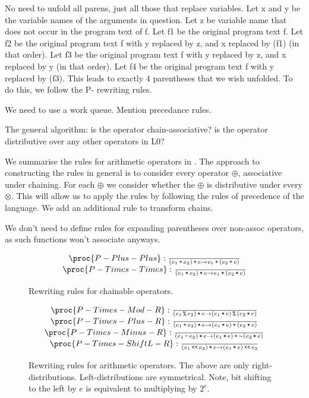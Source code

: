 No need to unfold all parens, just all those that replace variables. Let x and
y be the variable names of the arguments in question. Let z be variable name
that does not occur in the program text of f. Let f1 be the original program
text f. Let f2 be the original program text f with y replaced by z, and x
replaced by (f1) (in that order). Let f3 be the original program text f with y
replaced by z, and x replaced by y (in that order). Let f4 be the original
program text f with y replaced by (f3). This leads to exactly 4 parentheses
that we wish unfolded. To do this, we follow the P- rewriting rules.

We need to use a work queue. Mention precedance rules.

The general algorithm: is the operator chain-associative? is the operator
distributive over any other operators in L0?

We summarise the rules for arithmetic operators in
. The approach to constructing the rules in
general is to consider every operator $\oplus$, associative under chaining. For
each $\oplus$ we consider whether the $\oplus$ is distributive under every
$\otimes$. This will allow us to apply the rules by following the rules of
precedence of the language. We add an additional rule to transform chains.

We don't need to define rules for expanding parentheses over non-assoc
operators, as such functions won't associate anyways.

\begin{figure*}[htbp!]

\[
\begin{matrix}
\proc{P-Plus-Plus}:{\over
\p{e_1 \lp e_2}\lp e \rightarrow e_1 \lp \p{ e_2 \lp e }
}\\
\proc{P-Times-Times}:{\over
\p{e_1\lt e_2}\lt e \rightarrow e_1 \lt \p{ e_2 \lt e }
}\\
\end{matrix}
\]
\caption[]{Rewriting rules for chainable operators.}
\label{figure:rewriting-arithop}
\end{figure*}


\begin{figure*}[htbp!]

\[
\begin{matrix}
\proc{P-Times-Mod-R}:{\over
\p{e_1 \lmod e_2}\lt e \rightarrow \p{ e_1 \lt e } \lmod \p{ e_2 \lt e }
}\\
\proc{P-Times-Plus-R}:{\over
\p{e_1 \lp e_2}\lt e \rightarrow \p{ e_1 \lt e } \lp \p{ e_2 \lt e }
}\\
\proc{P-Times-Minus-R}:{\over
\p{e_1 \lm e_2}\lt e \rightarrow \p{ e_1 \lt e } \lp \lneg\p{ e_2 \lt e }
}\\
\proc{P-Times-ShiftL-R}:{\over
\p{e_1 \LBSL e_2}\lt e \rightarrow \p{ e_1 \lt e } \LBSL e_2
}
\end{matrix}
\]
\caption[]{Rewriting rules for arithmetic operators. The above are only
right-distributions. Left-distributions are symmetrical. Note, bit shifting to
the left by $e$ is equivalent to multiplying by $2^e$.}
\label{figure:rewriting-arithop}
\end{figure*}



